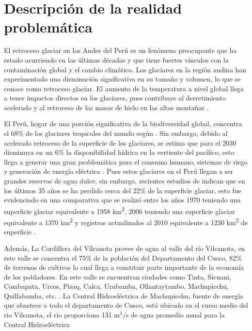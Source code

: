 \section{Descripción de la realidad problemática}

El retroceso glaciar en los Andes del Perú es un fenómeno preocupante que ha estado ocurriendo en las últimas décadas y que tiene fuertes vínculos con la contaminación global y el cambio climático. Los glaciares en la región andina han experimentado una disminución significativa en su tamaño y volumen, lo que se conoce como retroceso glaciar. El aumento de la temperatura a nivel global llega a tener impactos directos en los glaciares, pues contribuye al derretimiento acelerado y al retroceso de las masas de hielo en las altas montañas \parencite{drenkhan2018current}.

El Perú, hogar de una porción significativa de la biodiversidad global, concentra el 68{\%} de los glaciares tropicales del mundo según \parencite{inaigem2023}. Sin embargo, debido al acelerado retroceso de la superficie de los glaciares, se estima que para el 2030 disminuya en un 6{\%} la disponibilidad hídrica en la vertiente del pacífico, esto llega a generar una gran problemática para el consumo humano, sistemas de riego y generación de energía eléctrica \parencite{ruiz2023deglaciacion}.  Pues estos glaciares en el Perú llegan a ser grandes reservas de agua dulce, sin embargo, recientes estudios de \parencite{aliaga2018retroceso} indican que en los últimos 35 años se ha perdido cerca del 22{\%} de la superficie glaciar, esto fue evidenciado en una comparativa que se realizó entre los años 1970 teniendo una superficie glaciar equivalente a 1958 km\textsuperscript{2}, 2006 teniendo una superficie glaciar equivalente a 1370 km\textsuperscript{2} y registros actualizados al 2010 equivalente a 1230 km\textsuperscript{2} de superficie .

Además, La Cordillera del Vilcanota provee de agua al valle del río Vilcanota, en este valle se concentra el 75{\%} de la población del Departamento del Cusco, 82{\%} de terrenos de cultivos lo cual llega a constituir parte importante de la economía de los pobladores. En este valle se encuentran ciudades como Tinta, Sicuani, Combapata, Urcos, Pisaq, Calca, Urubamba, Ollantaytambo, Machupicchu, Quillabamba, etc.  \parencite{porcel2015iniciacion}. La Central Hidroeléctrica de Machupicchu,  fuente de energía que abastece a todo el departamento de Cusco, está ubicado en el curso medio del rio Vilcanota, el río proporciona 131 m$^3/$s de agua promedio anual para la Central Hidroeléctrica \parencite{cabrera2019curvas}


